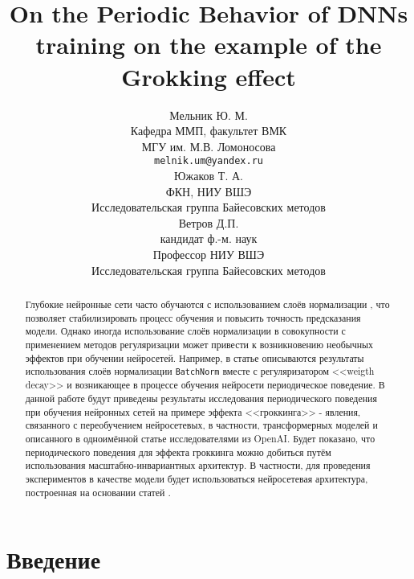 \documentclass{article}
\title{On the Periodic Behavior of DNNs training on the example of
the Grokking effect}
\author{ Мельник Ю. М. \\
	Кафедра ММП, факультет ВМК \\
    МГУ им. М.В. Ломоносова\\
	\texttt{melnik.um@yandex.ru} \\
	\And
    Южаков Т. А.\\
	ФКН, НИУ ВШЭ\\
    Исследовательская группа Байесовских методов\\
    \And
    Ветров Д.П.\\
    кандидат ф.-м. наук\\
    Профессор НИУ ВШЭ\\
    Исследовательская группа Байесовских методов\\
}
\date{}
\begin{document}
\maketitle

\begin{abstract}
	Глубокие нейронные сети часто обучаются с использованием слоёв нормализации \cite{batch_norm, layer_norm}, что позволяет стабилизировать процесс обучения и повысить точность предсказания модели. Однако иногда использование слоёв нормализации в совокупности с применением методов регуляризации может привести к возникновению необычных эффектов при обучении нейросетей. Например, в статье  \cite{on_periodic_beh} описываются результаты использования слоёв нормализации \verb|BatchNorm| вместе с регуляризатором <<weigth decay>> и возникающее в процессе обучения нейросети периодическое поведение. В данной работе будут приведены результаты исследования периодического поведения при обучения нейронных сетей на примере эффекта <<гроккинга>> - явления, связанного с переобучением нейросетевых, в частности, трансформерных моделей и описанного в одноимённой статье \cite{grokking_start} исследователями из OpenAI. Будет показано, что периодического поведения для эффекта гроккинга можно добиться путём использования масштабно-инвариантных архитектур. В частности, для проведения экспериментов в качестве модели будет использоваться нейросетевая архитектура, построенная на основании статей \cite{omnigrok, si_attn}.
\end{abstract}


\section{Введение}
\end{document}
